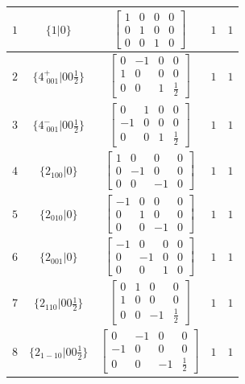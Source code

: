 \documentclass[fleqn,8pt]{jsarticle}
\begin{document}
\begin{longtable}{ccccc}
$ 1 $ & $ \{1|0\} $ & $ \begin{bmatrix} 1 & 0 & 0 & 0 \\ 0 & 1 & 0 & 0 \\ 0 & 0 & 1 & 0 \end{bmatrix} $ & $ 1 $ & $ 1 $ \\ \hline
$ 2 $ & $ \{4^{+}_{\,\,001}|0 0 \frac{1}{2}\} $ & $ \begin{bmatrix} 0 & -1 & 0 & 0 \\ 1 & 0 & 0 & 0 \\ 0 & 0 & 1 & \frac{1}{2} \end{bmatrix} $ & $ 1 $ & $ 1 $ \\ \hline
$ 3 $ & $ \{4^{-}_{\,\,001}|0 0 \frac{1}{2}\} $ & $ \begin{bmatrix} 0 & 1 & 0 & 0 \\ -1 & 0 & 0 & 0 \\ 0 & 0 & 1 & \frac{1}{2} \end{bmatrix} $ & $ 1 $ & $ 1 $ \\ \hline
$ 4 $ & $ \{2{}_{100}|0\} $ & $ \begin{bmatrix} 1 & 0 & 0 & 0 \\ 0 & -1 & 0 & 0 \\ 0 & 0 & -1 & 0 \end{bmatrix} $ & $ 1 $ & $ 1 $ \\ \hline
$ 5 $ & $ \{2{}_{010}|0\} $ & $ \begin{bmatrix} -1 & 0 & 0 & 0 \\ 0 & 1 & 0 & 0 \\ 0 & 0 & -1 & 0 \end{bmatrix} $ & $ 1 $ & $ 1 $ \\ \hline
$ 6 $ & $ \{2{}_{001}|0\} $ & $ \begin{bmatrix} -1 & 0 & 0 & 0 \\ 0 & -1 & 0 & 0 \\ 0 & 0 & 1 & 0 \end{bmatrix} $ & $ 1 $ & $ 1 $ \\ \hline
$ 7 $ & $ \{2{}_{110}|0 0 \frac{1}{2}\} $ & $ \begin{bmatrix} 0 & 1 & 0 & 0 \\ 1 & 0 & 0 & 0 \\ 0 & 0 & -1 & \frac{1}{2} \end{bmatrix} $ & $ 1 $ & $ 1 $ \\ \hline
$ 8 $ & $ \{2{}_{1-10}|0 0 \frac{1}{2}\} $ & $ \begin{bmatrix} 0 & -1 & 0 & 0 \\ -1 & 0 & 0 & 0 \\ 0 & 0 & -1 & \frac{1}{2} \end{bmatrix} $ & $ 1 $ & $ 1 $ \\ \hline

\end{longtable}
\end{document}
